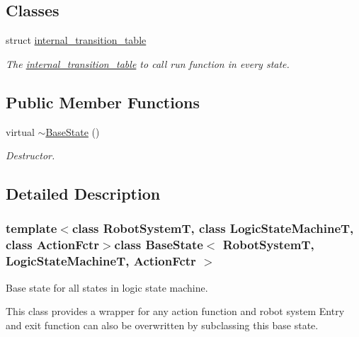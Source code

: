 \subsection*{Classes}
\begin{DoxyCompactItemize}
\item 
struct \hyperlink{structBaseState_1_1internal__transition__table}{internal\-\_\-transition\-\_\-table}
\begin{DoxyCompactList}\small\item\em The \hyperlink{structBaseState_1_1internal__transition__table}{internal\-\_\-transition\-\_\-table} to call run function in every state. \end{DoxyCompactList}\end{DoxyCompactItemize}
\subsection*{Public Member Functions}
\begin{DoxyCompactItemize}
\item 
virtual \hyperlink{classBaseState_a3967d85ffd88b9235fcfd9732e745c13}{$\sim$\-Base\-State} ()
\begin{DoxyCompactList}\small\item\em Destructor. \end{DoxyCompactList}\end{DoxyCompactItemize}


\subsection{Detailed Description}
\subsubsection*{template$<$class Robot\-System\-T, class Logic\-State\-Machine\-T, class Action\-Fctr$>$class Base\-State$<$ Robot\-System\-T, Logic\-State\-Machine\-T, Action\-Fctr $>$}

Base state for all states in logic state machine. 

This class provides a wrapper for any action function and robot system Entry and exit function can also be overwritten by subclassing this base state. 

